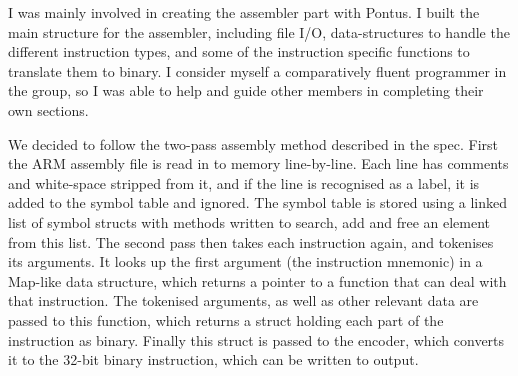 I was mainly involved in creating the assembler part with Pontus. I built the main structure for the assembler, including file I/O, data-structures to handle the different instruction types, and some of the instruction specific functions to translate them to binary. I consider myself a comparatively fluent programmer in the group, so I was able to help and guide other members in completing their own sections. 

We decided to follow the two-pass assembly method described in the spec. First the ARM assembly file is read in to memory line-by-line. Each line has comments and white-space stripped from it, and if the line is recognised as a label, it is added to the symbol table and ignored. The symbol table is stored using a linked list of symbol structs with methods written to search, add and free an element from this list. The second pass then takes each instruction again, and tokenises its arguments. It looks up the first argument (the instruction mnemonic) in a Map-like data structure, which returns a pointer to a function that can deal with that instruction. The tokenised arguments, as well as other relevant data are passed to this function, which returns a struct holding each part of the instruction as binary. Finally this struct is passed to the encoder, which converts it to the 32-bit binary instruction, which can be written to output.